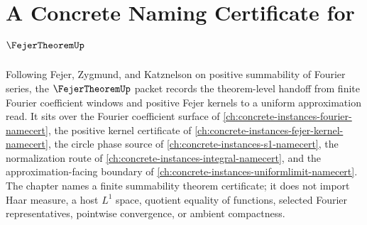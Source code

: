 \chapter{A Concrete Naming Certificate for $\FejerTheoremUp$}
\label{ch:concrete-instances-fejer-theorem-namecert}

Following Fejer, Zygmund, and Katznelson on positive summability of Fourier series, the $\FejerTheoremUp$ packet records the theorem-level handoff from finite Fourier coefficient windows and positive Fejer kernels to a uniform approximation read. It sits over the Fourier coefficient surface of \autoref{ch:concrete-instances-fourier-namecert}, the positive kernel certificate of \autoref{ch:concrete-instances-fejer-kernel-namecert}, the circle phase source of \autoref{ch:concrete-instances-s1-namecert}, the normalization route of \autoref{ch:concrete-instances-integral-namecert}, and the approximation-facing boundary of \autoref{ch:concrete-instances-uniformlimit-namecert}. The chapter names a finite summability theorem certificate; it does not import Haar measure, a host $L^{1}$ space, quotient equality of functions, selected Fourier representatives, pointwise convergence, or ambient compactness.

